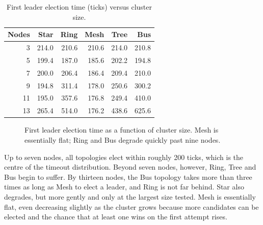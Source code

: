 \begin{table}[H]
\centering
\caption{First leader election time (ticks) versus cluster size.}
\label{tab:exp2_election}
\begin{tabular}{rrrrrr}
\toprule
\textbf{Nodes} & \textbf{Star} & \textbf{Ring} & \textbf{Mesh} & \textbf{Tree} & \textbf{Bus} \\
\midrule
3  & 214.0 & 210.6 & 210.6 & 214.0 & 210.8 \\
5  & 199.4 & 187.0 & 185.6 & 202.2 & 194.8 \\
7  & 200.0 & 206.4 & 186.4 & 209.4 & 210.0 \\
9  & 194.8 & 311.4 & 178.0 & 250.6 & 300.2 \\
11 & 195.0 & 357.6 & 176.8 & 249.4 & 410.0 \\
13 & 265.4 & 514.0 & 176.2 & 438.6 & 625.6 \\
\bottomrule
\end{tabular}
\end{table}

\begin{figure}[H]
\centering
{}
\caption{First leader election time as a function of cluster size. Mesh is essentially flat; Ring and Bus degrade quickly past nine nodes.}
\label{fig:exp2_election}
\end{figure}

Up to seven nodes, all topologies elect within roughly 200 ticks, which is the centre of the timeout distribution. Beyond seven nodes, however, Ring, Tree and Bus begin to suffer. By thirteen nodes, the Bus topology takes more than three times as long as Mesh to elect a leader, and Ring is not far behind. Star also degrades, but more gently and only at the largest size tested. Mesh is essentially flat, even decreasing slightly as the cluster grows because more candidates can be elected and the chance that at least one wins on the first attempt rises.

